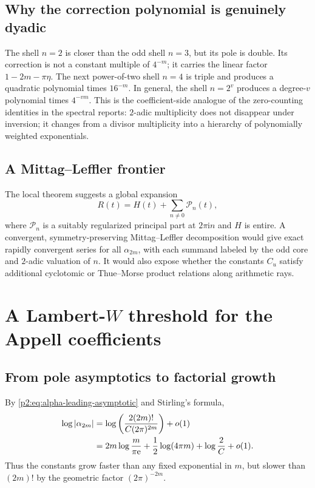 \documentclass[11pt,oneside]{article}
\numberwithin{equation}{section}
\theoremstyle{definition}
\theoremstyle{remark}
\newcommand{\e}{\mathrm e}
\newcommand{\ii}{\mathrm i}
\begin{document}
\subsection{Why the correction polynomial is genuinely dyadic}

The shell $n=2$ is closer than the odd shell $n=3$, but its pole is double.  Its correction is not a
constant multiple of $4^{-m}$; it carries the linear factor $1-2m-\pi\eta$.  The next power-of-two
shell $n=4$ is triple and produces a quadratic polynomial times $16^{-m}$.  In general, the shell
$n=2^v$ produces a degree-$v$ polynomial times $4^{-vm}$.  This is the coefficient-side analogue
of the zero-counting identities in the spectral reports: $2$-adic multiplicity does not disappear
under inversion; it changes from a divisor multiplicity into a hierarchy of polynomially weighted
exponentials.

\subsection{A Mittag--Leffler frontier}

The local theorem suggests a global expansion
\begin{equation}
 R(t)=H(t)+\sum_{n\ne0}\mathcal P_n(t),
 \label{p2:eq:mittag-leffler-formal}
\end{equation}
where $\mathcal P_n$ is a suitably regularized principal part at $2\pi\ii n$ and $H$ is entire.
A convergent, symmetry-preserving Mittag--Leffler decomposition would give exact rapidly convergent
series for all $\alpha_{2m}$, with each summand labeled by the odd core and $2$-adic valuation of
$n$.  It would also expose whether the constants $C_u$ satisfy additional cyclotomic or
Thue--Morse product relations along arithmetic rays.

\section{A Lambert-\texorpdfstring{$W$}{W} threshold for the Appell coefficients}
\label{p2:sec:lambert}

\subsection{From pole asymptotics to factorial growth}

By \eqref{p2:eq:alpha-leading-asymptotic} and Stirling's formula,
\begin{align}
 \log|\alpha_{2m}|
 &=\log\left(\frac{2(2m)!}{C(2\pi)^{2m}}\right)+\littleo(1)
 \notag\\
 &=2m\log\frac{m}{\pi\e}
 +\frac12\log(4\pi m)+\log\frac2C+\littleo(1).
 \label{p2:eq:log-alpha-Stirling}
\end{align}
Thus the constants grow faster than any fixed exponential in $m$, but slower than $(2m)!$ by the
geometric factor $(2\pi)^{-2m}$.
\end{document}
